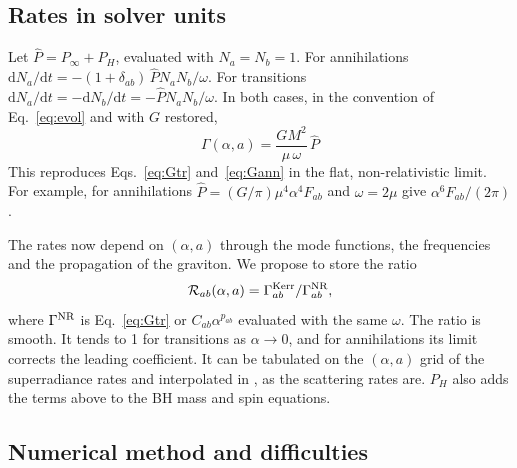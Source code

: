 \documentclass[11pt]{article}
\newcommand{\dd}{\mathrm{d}}
\newcommand{\code}[1]{\path{#1}}
\begin{document}
\subsection{Rates in solver units}

Let $\hat P=P_\infty+P_H$, evaluated with $N_a=N_b=1$. For annihilations $\dd N_a/\dd t=-(1+\delta_{ab})\,\hat P N_aN_b/\omega$. For transitions $\dd N_a/\dd t=-\dd N_b/\dd t=-\hat PN_aN_b/\omega$. In both cases, in the convention of Eq.~\eqref{eq:evol} and with $G$ restored,
\begin{equation}
\boxed{\;\Gamma(\alpha,a)=\frac{GM^2}{\mu\,\omega}\,\hat P\;}
\label{eq:Gkerr}
\end{equation}
This reproduces Eqs.~\eqref{eq:Gtr} and~\eqref{eq:Gann} in the flat, non-relativistic limit. For example, for annihilations $\hat P=(G/\pi)\mu^4\alpha^4F_{ab}$ and $\omega=2\mu$ give $\alpha^6F_{ab}/(2\pi)$.

The rates now depend on $(\alpha,a)$ through the mode functions, the frequencies and the propagation of the graviton. We propose to store the ratio
\begin{equation}
\mathcal R_{ab}(\alpha,a)=\Gamma^{\rm Kerr}_{ab}/\Gamma^{\rm NR}_{ab},
\end{equation}
where $\Gamma^{\rm NR}$ is Eq.~\eqref{eq:Gtr} or $C_{ab}\alpha^{p_{ab}}$ evaluated with the same $\omega$. The ratio is smooth. It tends to 1 for transitions as $\alpha\to0$, and for annihilations its limit corrects the leading coefficient. It can be tabulated on the $(\alpha,a)$ grid of the superradiance rates and interpolated in \code{gw_rhs!}, as the scattering rates are. $P_H$ also adds the terms above to the BH mass and spin equations.

\subsection{Numerical method and difficulties}
\end{document}
